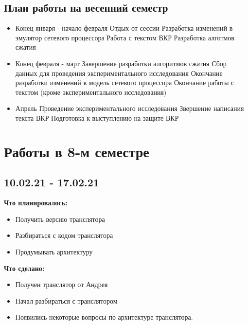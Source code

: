 \documentclass[a4peper, 12pt, titlepage, finall]{extreport}
\begin{document}
        \subsection{План работы на весенний семестр}
            \begin{itemize}
                \item Конец января - начало февраля
                    \subitem Отдых от сессии
                    \subitem Разработка изменений в эмулятор сетевого процессора
                    \subitem Работа с текстом ВКР
                    \subitem Разработка алготмов сжатия
                \item Конец февраля - март
                    \subitem Завершение разработки алгоритмов сжатия
                    \subitem Сбор данных для проведения экспериментального исследования
                    \subitem Окончание разработки изменений в модель сетевого процессора
                    \subitem Окончание работы с текстом (кроме экспериментального исследования)
                \item Апрель
                    \subitem Проведение экспериментального исследования
                    \subitem Звершение написания текста ВКР
                    \subitem Подготовка к выступлению на защите ВКР
            \end{itemize}
    \section{Работы в 8-м семестре}
        \subsection{10.02.21 - 17.02.21}
            {\bf Что планировалось:}
            \begin{itemize}
                \item Получить версию транслятора
                \item Разбираться с кодом транслятора
                \item Продумывать архитектуру
            \end{itemize}
            {\bf Что сделано:}
            \begin{itemize}
                \item Получен транслятор от Андрея
                \item Начал разбираться с транслятором
                \item Появились некоторые вопросы по архитектуре транслятора.
            \end{itemize}
\end{document}
